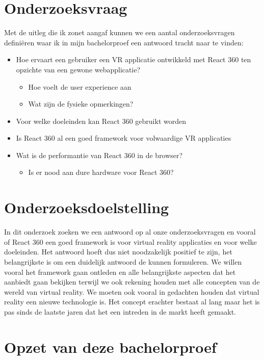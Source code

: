 \section{Onderzoeksvraag}
\label{sec:onderzoeksvraag}

Met de uitleg die ik zonet aangaf kunnen we een aantal onderzoeksvragen definiëren waar ik in mijn bachelorproef een antwoord tracht naar te vinden:
\begin{itemize}
  \item	Hoe ervaart een gebruiker een VR applicatie ontwikkeld met React 360 ten opzichte van een gewone webapplicatie?
  \begin{itemize}
  \item	Hoe voelt de user experience aan
  \item	Wat zijn de fysieke opmerkingen?
  \end{itemize}
  \item	Voor welke doeleinden kan React 360 gebruikt worden
  \item	Is React 360 al een goed framework voor volwaardige VR applicaties
  \item	Wat is de performantie van React 360 in de browser?
  \begin{itemize}
  \item Is er nood aan dure hardware voor React 360?
  \end{itemize}
\end{itemize}



\section{Onderzoeksdoelstelling}
\label{sec:onderzoeksdoelstelling}

In dit onderzoek zoeken we een antwoord op al onze onderzoeksvragen en vooral of React 360 een goed framework is voor virtual reality applicaties en voor welke doeleinden. Het antwoord hoeft dus niet noodzakelijk positief te zijn, het belangrijkste is om een duidelijk antwoord de kunnen formuleren. We willen vooral het framework gaan ontleden en alle belangrijkste aspecten dat het aanbiedt gaan bekijken terwijl we ook rekening houden met alle concepten van de wereld van virtual reality. We moeten ook vooral in gedachten houden dat virtual reality een nieuwe technologie is. Het concept erachter bestaat al lang maar het is pas sinds de laatste jaren dat het een intreden in de markt heeft gemaakt.

\section{Opzet van deze bachelorproef}
\label{sec:opzet-bachelorproef}

